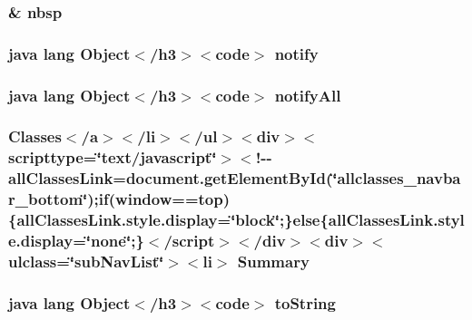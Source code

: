 \hypertarget{_build_config_8html_aef915316f784c9063d942974538301a6}{
\subsubsection[{nbsp}]{\setlength{\rightskip}{0pt plus 5cm}\& nbsp}}\label{_build_config_8html_aef915316f784c9063d942974538301a6}
\hypertarget{_build_config_8html_ae99ae10b5010594dbda4794e02db271b}{
\subsubsection[{notify}]{\setlength{\rightskip}{0pt plus 5cm}java lang Object$<$/h3$>$$<$code$>$ notify}}\label{_build_config_8html_ae99ae10b5010594dbda4794e02db271b}
\hypertarget{_build_config_8html_a1279357e6e09e33e75b55eb05fdb6436}{
\subsubsection[{notify\-All}]{\setlength{\rightskip}{0pt plus 5cm}java lang Object$<$/h3$>$$<$code$>$ notify\-All}}\label{_build_config_8html_a1279357e6e09e33e75b55eb05fdb6436}
\hypertarget{_build_config_8html_a6f9ab45abc9b0679dc1b132fbacfc681}{
\subsubsection[{Summary}]{\setlength{\rightskip}{0pt plus 5cm}Classes$<$/{\bf a}$>$$<$/li$>$$<$/ul$>$$<$div$>$$<$scripttype=\char`\"{}text/javascript\char`\"{}$>$$<$!-\/-\/all\-Classes\-Link=document.\-get\-Element\-By\-Id(\char`\"{}allclasses\-\_\-navbar\-\_\-bottom\char`\"{});if(window==top)\{all\-Classes\-Link.\-style.\-display=\char`\"{}block\char`\"{};\}else\{all\-Classes\-Link.\-style.\-display=\char`\"{}none\char`\"{};\}$<$/script$>$$<$/div$>$$<$div$>$$<$ulclass=\char`\"{}sub\-Nav\-List\char`\"{}$>$$<$li$>$ Summary}}\label{_build_config_8html_a6f9ab45abc9b0679dc1b132fbacfc681}
\hypertarget{_build_config_8html_a36e8a76a4132c9a7081416f27d087615}{
\subsubsection[{to\-String}]{\setlength{\rightskip}{0pt plus 5cm}java lang Object$<$/h3$>$$<$code$>$ to\-String}}\label{_build_config_8html_a36e8a76a4132c9a7081416f27d087615}
